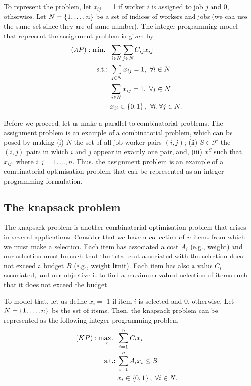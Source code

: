 To represent the problem, let $x_{ij} =$ 1 if worker $i$ is assigned to job $j$ and 0, otherwise. Let $N = \left\{ 1,\dots,n \right \}$ be a set of indices of workers and jobs (we can use the same set since they are of same number). The integer programming model that represent the assignment problem is given by
%  
\begin{align*} 
  (AP) : \mathop{\text{min.~}} \ & \sum_{i \in N}\sum_{j \in N} C_{ij}x_{ij} \\
  \mathop{\text{s.t.:~}} & \sum_{j \in N} x_{ij} = 1, \ \forall i \in N\\
      & \sum_{i \in N} x_{ij} = 1, \ \forall j \in N\\
      & x_{ij} \in \left\{ 0,1 \right \},  \ \forall i, \forall j \in N.
\end{align*}
%

Before we proceed, let us make a parallel to combinatorial problems. The assignment problem is an example of a combinatorial problem, which can be posed by making (i) $N$ the set of all job-worker pairs $(i,j)$; (ii) $S \in \mathcal{F}$ the $(i,j)$ pairs in which $i$ and $j$ appear in exactly one pair, and, (iii) $x^S$ such that $x_{ij}$, where $i,j = 1,\dots,n$. Thus, the assignment problem is an example of a combinatorial optimisation problem that can be represented as an integer programming formulation.


\subsection{The knapsack problem}

The knapsack problem is another combinatorial optimisation problem that arises in several applications. Consider that we have a collection of $n$ items from which we must make a selection. Each item has associated a cost $A_i$ (e.g., weight) and our selection must be such that the total cost associated with the selection does not exceed a budget $B$ (e.g., weight limit). Each item has also a value $C_i$ associated, and our objective is to find a maximum-valued selection of items such that it does not exceed the budget. 

To model that, let us define $x_{i} =$ 1 if item $i$ is selected and 0, otherwise. Let $N = \left\{ 1,\dots,n \right \}$ be the set of items. Then, the knapsack problem can be represented as the following integer programming problem     
%  
\begin{align*}
	(KP) : \mathop{\text{max.~}}_x \ & \sum_{i=1}^nC_{i}x_{i} \\
	\mathop{\text{s.t.:~}} & \sum_{i = 1}^n A_{i}x_{i} \leq B\\
	  & x_{i} \in \left\{ 0,1 \right \}, \ \forall i \in N. 
\end{align*}

